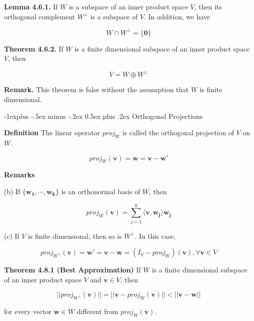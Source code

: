 \documentclass[10pt,landscape]{article}
\makeatletter
\renewcommand{\subsection}{\@startsection{subsection}{2}{0mm}%
                                {-1explus -.5ex minus -.2ex}%
                                {0.5ex plus .2ex}%
                                {\normalfont\normalsize\bfseries}}
\makeatother
\begin{document}
\begin{multicols}{4}
\textbf{Lemma 4.6.1.} If $W$ is a subspace of an inner product space $V$, then its orthogonal complement $W^{\perp}$ is a subspace of $V$. In addition, we have 

$$
W \cap W^{\perp} = \{ \mathbf{0} \}
$$

\textbf{Theorem 4.6.2.} If $W$ is a finite dimensional subspace of an inner product space $V$, then 

$$
V = W \oplus W^{\perp}
$$

\textbf{Remark.} This theorem is false without the assumption that $W$ is finite dimensional.

\subsection{Orthogonal Projections}




\textbf{Definition} The linear operator $proj_W$ is called the orthogonal projection of $V$ on $W$.

$$
proj_W(\mathbf{v}) = \mathbf{w} = \mathbf{v - w'}
$$


\textbf{Remarks}

(b) If $\{ \mathbf{w_1, \cdots, w_k} \}$ is an orthonormal basis of $W$, then 

$$
proj_W(\mathbf{v}) = \sum^k_{j = 1} \langle \mathbf{v, w_j} \rangle \mathbf{w_j}
$$

(c) If $V$ is finite dimensional, then so is $W^{\perp}$. In this case,

$$
proj_{W^{\perp}} (\mathbf{v}) = \mathbf{w'} = \mathbf{v - w} = (I_V - proj_W)(\mathbf{v}), \forall \mathbf{v} \in V
$$

\textbf{Theorem 4.8.1 (Best Approximation)} If $W$ is a finite dimensional subspace of an inner product space $V$ and $\mathbf{v} \in V$, then 

$$
|| proj_{W^{\perp}} (\mathbf{v})  || = || \mathbf{v} - proj_W(\mathbf{v}) || < || \mathbf{v} - \mathbf{w}||
$$

for every vector $\mathbf{w} \in W$ different from $proj_W(\mathbf{v})$.


\end{multicols}
\end{document}
